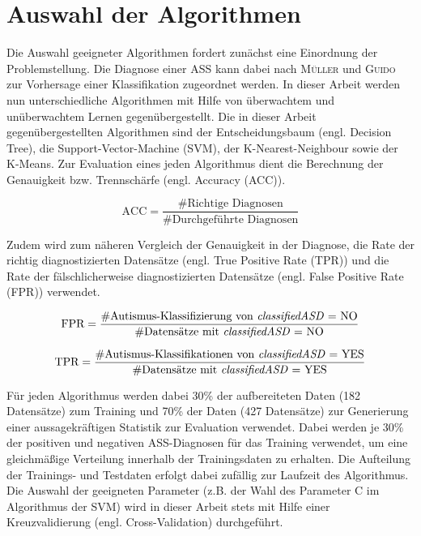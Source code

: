 \section{Auswahl der Algorithmen} \label{sec:algorithms}
Die Auswahl geeigneter Algorithmen fordert zunächst eine Einordnung der Problemstellung. Die Diagnose einer ASS kann dabei nach \textsc{Müller} und \textsc{Guido} \cite[S.~94]{Muller2016} zur Vorhersage einer Klassifikation zugeordnet werden. In dieser Arbeit werden nun unterschiedliche Algorithmen mit Hilfe von überwachtem und unüberwachtem Lernen \cite[S.~93]{Muller2016} gegenübergestellt. 
Die in dieser Arbeit gegenübergestellten Algorithmen sind der Entscheidungsbaum (engl. \glqq Decision Tree\grqq), die Support-Vector-Machine (SVM), der K-Nearest-Neighbour sowie der K-Means. %
Zur Evaluation eines jeden Algorithmus dient die Berechnung der Genauigkeit bzw. Trennschärfe (engl. \glqq Accuracy\grqq{} (ACC)).

\begin{equation} \label{math:accuracy}
\text{ACC} = \frac{\#\text{Richtige Diagnosen}}{\#\text{Durchgeführte Diagnosen}}
\end{equation}

Zudem wird zum näheren Vergleich der Genauigkeit in der Diagnose, die Rate der richtig diagnostizierten Datensätze (engl. \glqq True Positive Rate\grqq{} (TPR)) und die Rate der fälschlicherweise diagnostizierten Datensätze (engl. \glqq False Positive Rate\grqq{} (FPR)) verwendet.

\begin{equation} \label{math:fpr}
\text{FPR} = \frac{\#\text{Autismus-Klassifizierung von \textit{classifiedASD} = NO}}{\#\text{Datensätze mit \textit{classifiedASD} = NO}}
\end{equation}

{\setlength{\parindent}{0cm}
\begin{equation} \label{math:tpr}
\text{TPR} = \frac{\#\text{Autismus-Klassifikationen von \textit{classifiedASD} = YES}}{\#\text{Datensätze mit \textit{classifiedASD} = YES}}
\end{equation}}

Für jeden Algorithmus werden dabei 30\% der aufbereiteten Daten (182 Datensätze) zum Training und 70\%  der Daten (427 Datensätze) zur Generierung einer aussagekräftigen Statistik zur Evaluation verwendet. Dabei werden je 30\% der positiven und negativen ASS-Diagnosen für das Training verwendet, um eine gleichmäßige Verteilung innerhalb der Trainingsdaten zu erhalten. Die Aufteilung der Trainings- und Testdaten erfolgt dabei zufällig zur Laufzeit des Algorithmus. Die Auswahl der geeigneten Parameter (z.B. der Wahl des Parameter C im Algorithmus der SVM) wird in dieser Arbeit stets mit Hilfe einer Kreuzvalidierung (engl. \glqq Cross-Validation\grqq{}) durchgeführt.

